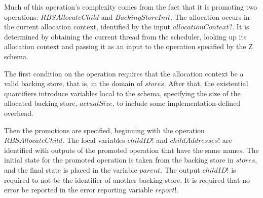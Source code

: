 \documentclass[a4paper,10pt]{article}
\begin{document}
Much of this operation's complexity comes from the fact that it is
promoting two operations: $RBSAllocateChild$ and $BackingStoreInit$. The
allocation occurs in the current allocation context, identified by the input
$allocationContext?$. It is determined by obtaining the current thread from the
scheduler, looking up its allocation context and passing it as an input to the
operation specified by the Z schema.

The first condition on the operation requires that the allocation context be a
valid backing store, that is, in the domain of $stores$. After that, the
existential quantifiers introduce variables local to the schema, specifying the
size of the allocated backing store, $actualSize$, to include some
implementation-defined overhead.

Then the promotions are specified, beginning with the operation
$RBSAllocateChild$. The local variables $childID!$ and $childAddresses!$ are
identified with outputs of the promoted operation that have the same names. The
initial state for the promoted operation is taken from the backing store in
$stores$, and the final state is placed in the variable $parent$.  The output
$childID!$ is required to not be the identifier of another backing store. It is
required that no error be reported in the error reporting variable $report!$.
\end{document}
